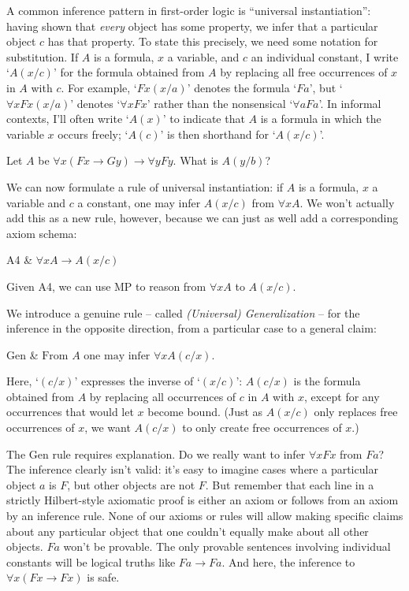 A common inference pattern in first-order logic is
``universal instantiation'':
having shown that \emph{every} object has some property,
we infer that a particular object $c$ has that property.
To state this precisely,
we need some notation for substitution.
If $A$ is a formula,
$x$ a variable, and
$c$ an individual constant,
I write `$A(x/c)$' for the formula
obtained from $A$ by
replacing all free occurrences of $x$ in $A$ with $c$.
For example,
`$Fx(x/a)$' denotes the formula `$Fa$',
but `$\forall x Fx(x/a)$' denotes `$\forall x Fx$'
rather than the nonsensical `$\forall a Fa$'.
In informal contexts,
I'll often write `$A(x)$' to indicate that
$A$ is a formula in which the variable $x$ occurs freely;
`$A(c)$' is then shorthand for `$A(x/c)$'.

\begin{exercise}
  Let $A$ be $\forall x (Fx \to Gy) \to  \forall y Fy$. What is $A(y/b)$?
\end{exercise}

We can now formulate a rule of universal instantiation:
if $A$ is a formula, $x$ a variable and $c$ a constant,
one may infer $A(x/c)$ from $\forall x A$.
We won't actually add this as a new rule, however,
because we can just as well add a corresponding axiom schema:
%
\begin{axioms}
  A4 & $\forall x A \to A(x/c)$
\end{axioms}
%
\noindent%
Given A4, we can use MP to reason from $\forall x A$ to $A(x/c)$.

We introduce a genuine rule -- called \emph{(Universal) Generalization} -- for the
inference in the opposite direction,
from a particular case to a general claim:

\begin{axioms}
    Gen & $\text{From }A \text{ one may infer }\forall x A(c/x).$
\end{axioms}


\noindent%
Here,
`$(c/x)$' expresses the inverse of `$(x/c)$':
$A(c/x)$ is the formula
obtained from $A$ by
replacing all occurrences of $c$ in $A$ with $x$,
except for any occurrences that would let $x$ become bound.
(Just as $A(x/c)$ only replaces free occurrences of $x$,
we want $A(c/x)$ to only create free occurrences of $x$.)

The Gen rule requires explanation.
Do we really want to infer $\forall x Fx$ from $Fa$?
The inference clearly isn't valid:
it's easy to imagine cases where a particular object $a$ is $F$,
but other objects are not $F$.
But remember that each line in a strictly Hilbert-style axiomatic proof
is either an axiom or follows from an axiom by an inference rule.
None of our axioms or rules will allow
making specific claims about any particular object
that one couldn't equally make about all other objects.
$Fa$ won't be provable.
The only provable sentences involving individual constants will be
logical truths like $Fa \to Fa$.
And here,
the inference to $\forall x (Fx \to Fx)$ is safe.

